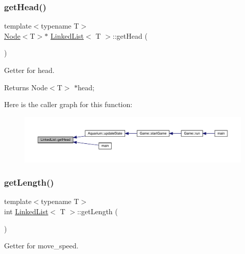 \subsubsection{\texorpdfstring{get\+Head()}{getHead()}}
{\footnotesize\ttfamily template$<$typename T$>$ \\
\mbox{\hyperlink{class_node}{Node}}$<$T$>$$\ast$ \mbox{\hyperlink{class_linked_list}{Linked\+List}}$<$ T $>$\+::get\+Head (\begin{DoxyParamCaption}{ }\end{DoxyParamCaption})\hspace{0.3cm}{\ttfamily [inline]}}



Getter for head. 

\begin{DoxyReturn}{Returns}
Node$<$\+T$>$ $\ast$head; 
\end{DoxyReturn}
Here is the caller graph for this function\+:\nopagebreak
\begin{figure}[H]
\begin{center}
\leavevmode
\includegraphics[width=350pt]{class_linked_list_aa4614ce35a543b74afb3c5bff8b018d4_icgraph}
\end{center}
\end{figure}
\mbox{\label{class_linked_list_ac650bde26cf5b3c074e2d59f97e0ff3b}} 
\subsubsection{\texorpdfstring{get\+Length()}{getLength()}}
{\footnotesize\ttfamily template$<$typename T$>$ \\
int \mbox{\hyperlink{class_linked_list}{Linked\+List}}$<$ T $>$\+::get\+Length (\begin{DoxyParamCaption}{ }\end{DoxyParamCaption})\hspace{0.3cm}{\ttfamily [inline]}}



Getter for move\+\_\+speed. 

